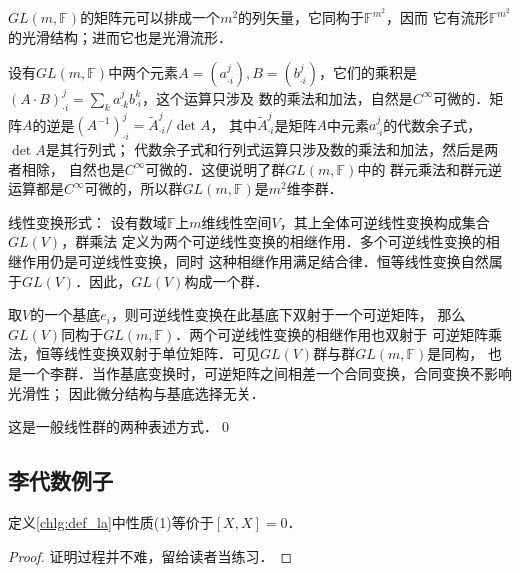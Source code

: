 $GL(m,\mathbb{F})$的矩阵元可以排成一个$m^2$的列矢量，它同构于$\mathbb{F}^{m^2}$，因而
它有流形$\mathbb{F}^{m^2}$的光滑结构；进而它也是光滑流形．

设有$GL(m,\mathbb{F})$中两个元素$A=(a^j_{\cdot i}), B=(b^j_{\cdot i})$，它们的乘积是
$(A\cdot B)^{j}_{\cdot i} = \sum_{k} a^j_{\cdot k} b^k_{\cdot i}$，这个运算只涉及
数的乘法和加法，自然是$C^\infty$可微的．矩阵$A$的逆是$(A^{-1})^{j}_{\cdot i}=\tilde{A}^{j}_{\cdot i}/{\det A}$，
其中$\tilde{A}^{j}_{\cdot i}$是矩阵$A$中元素$a^{j}_{\cdot i}$的代数余子式，$\det A$是其行列式；
代数余子式和行列式运算只涉及数的乘法和加法，然后是两者相除，
自然也是$C^\infty$可微的．这便说明了群$GL(m,\mathbb{F})$中的
群元乘法和群元逆运算都是$C^\infty$可微的，所以群$GL(m,\mathbb{F})$是$m^2$维{\kaishu 李群}．


{\heiti 线性变换形式}：
设有数域$\mathbb{F}$上$m$维线性空间$V$，其上全体可逆线性变换构成集合$GL(V)$，群乘法
定义为两个可逆线性变换的相继作用．多个可逆线性变换的相继作用仍是可逆线性变换，同时
这种相继作用满足结合律．恒等线性变换自然属于$GL(V)$．因此，$GL(V)$构成一个群．

取$V$的一个基底$e_i$，则可逆线性变换在此基底下双射于一个可逆矩阵，
那么$GL(V)$同构于$GL(m,\mathbb{F})$．两个可逆线性变换的相继作用也双射于
可逆矩阵乘法，恒等线性变换双射于单位矩阵．可见$GL(V)$群与群$GL(m,\mathbb{F})$是同构，
也是一个李群．当作基底变换时，可逆矩阵之间相差一个合同变换，合同变换不影响光滑性；
因此微分结构与基底选择无关．

这是一般线性群的两种表述方式．\qed



\subsection{李代数例子}

\begin{proposition}
    定义\ref{chlg:def_la}中性质(1)等价于$[X,X]=0$．
\end{proposition}
\begin{proof}
	证明过程并不难，留给读者当练习．
\end{proof}


